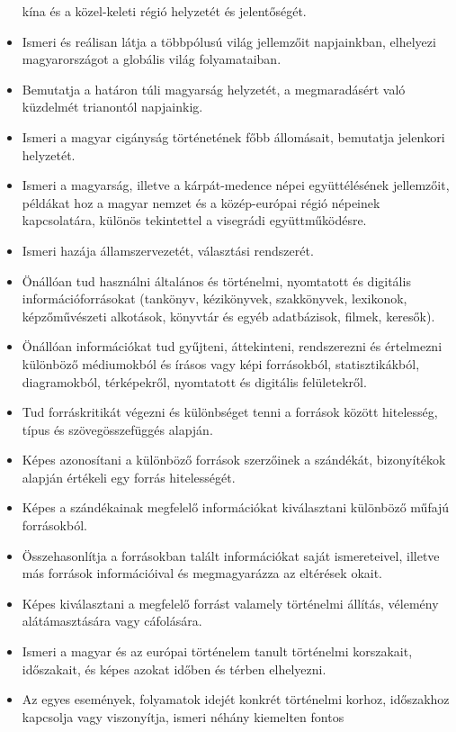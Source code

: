 \begin{itemize}
  kína és a közel-keleti régió helyzetét és jelentőségét.
\item
  Ismeri és reálisan látja a többpólusú világ jellemzőit napjainkban,
  elhelyezi magyarországot a globális világ folyamataiban.
\item
  Bemutatja a határon túli magyarság helyzetét, a megmaradásért való
  küzdelmét trianontól napjainkig.
\item
  Ismeri a magyar cigányság történetének főbb állomásait, bemutatja
  jelenkori helyzetét.
\item
  Ismeri a magyarság, illetve a kárpát-medence népei együttélésének
  jellemzőit, példákat hoz a magyar nemzet és a közép-európai régió
  népeinek kapcsolatára, különös tekintettel a visegrádi
  együttműködésre.
\item
  Ismeri hazája államszervezetét, választási rendszerét.
\item
  Önállóan tud használni általános és történelmi, nyomtatott és
  digitális információforrásokat (tankönyv, kézikönyvek, szakkönyvek,
  lexikonok, képzőművészeti alkotások, könyvtár és egyéb adatbázisok,
  filmek, keresők).
\item
  Önállóan információkat tud gyűjteni, áttekinteni, rendszerezni és
  értelmezni különböző médiumokból és írásos vagy képi forrásokból,
  statisztikákból, diagramokból, térképekről, nyomtatott és digitális
  felületekről.
\item
  Tud forráskritikát végezni és különbséget tenni a források között
  hitelesség, típus és szövegösszefüggés alapján.
\item
  Képes azonosítani a különböző források szerzőinek a szándékát,
  bizonyítékok alapján értékeli egy forrás hitelességét.
\item
  Képes a szándékainak megfelelő információkat kiválasztani különböző
  műfajú forrásokból.
\item
  Összehasonlítja a forrásokban talált információkat saját ismereteivel,
  illetve más források információival és megmagyarázza az eltérések
  okait.
\item
  Képes kiválasztani a megfelelő forrást valamely történelmi állítás,
  vélemény alátámasztására vagy cáfolására.
\item
  Ismeri a magyar és az európai történelem tanult történelmi korszakait,
  időszakait, és képes azokat időben és térben elhelyezni.
\item
  Az egyes események, folyamatok idejét konkrét történelmi korhoz,
  időszakhoz kapcsolja vagy viszonyítja, ismeri néhány kiemelten fontos

\end{itemize}
